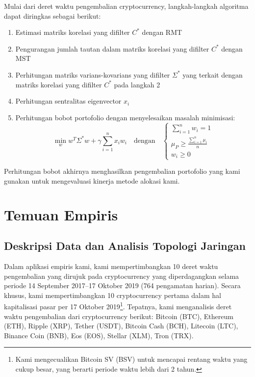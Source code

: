 \documentclass[12pt,a4paper]{article}
\begin{document}
Mulai dari deret waktu pengembalian cryptocurrency, langkah-langkah algoritma dapat diringkas sebagai berikut:

\begin{enumerate}
\item Estimasi matriks korelasi yang difilter $C^*$ dengan RMT
\item Pengurangan jumlah tautan dalam matriks korelasi yang difilter $C^*$ dengan MST
\item Perhitungan matriks varians-kovarians yang difilter $\Sigma^*$ yang terkait dengan matriks korelasi yang difilter $C^*$ pada langkah 2
\item Perhitungan sentralitas eigenvector $x_i$
\item Perhitungan bobot portofolio dengan menyelesaikan masalah minimisasi:
\[
\min_w w^T \Sigma^* w + \gamma \sum_{i=1}^{n} x_i w_i \quad \text{dengan} \quad \begin{cases}
\sum_{i=1}^{n} w_i = 1 \\
\mu_P \geq \frac{\sum_{i=1}^{n} \mu_i}{n} \\
w_i \geq 0
\end{cases}
\]
\end{enumerate}

Perhitungan bobot akhirnya menghasilkan pengembalian portofolio yang kami gunakan untuk mengevaluasi kinerja metode alokasi kami.

\section{Temuan Empiris}

\subsection{Deskripsi Data dan Analisis Topologi Jaringan}

Dalam aplikasi empiris kami, kami mempertimbangkan 10 deret waktu pengembalian yang dirujuk pada cryptocurrency yang diperdagangkan selama periode 14 September 2017–17 Oktober 2019 (764 pengamatan harian). Secara khusus, kami mempertimbangkan 10 cryptocurrency pertama dalam hal kapitalisasi pasar per 17 Oktober 2019\footnote{Kami mengecualikan Bitcoin SV (BSV) untuk mencapai rentang waktu yang cukup besar, yang berarti periode waktu lebih dari 2 tahun.}. Tepatnya, kami menganalisis deret waktu pengembalian dari cryptocurrency berikut: Bitcoin (BTC), Ethereum (ETH), Ripple (XRP), Tether (USDT), Bitcoin Cash (BCH), Litecoin (LTC), Binance Coin (BNB), Eos (EOS), Stellar (XLM), Tron (TRX).
\end{document}
